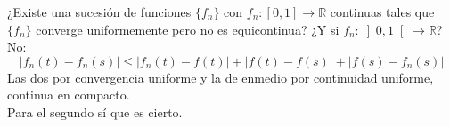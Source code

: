 \begin{ejercicio}
    ¿Existe una sucesión de funciones $\{f_n\}$ con $f_n:[0,1]\to \mathbb{R}$ continuas tales que $\{f_n\}$ converge uniformemente pero no es equicontinua? ¿Y si $f_n:\left]0,1\right[\to \mathbb{R}$?\\

    \noindent
    No:
    \begin{equation*}
        |f_n(t) - f_n(s)| \leq |f_n(t) - f(t)| + |f(t) - f(s)| + |f(s) - f_n(s)|
    \end{equation*}
    Las dos por convergencia uniforme y la de enmedio por continuidad uniforme, continua en compacto.\\

    \noindent
    Para el segundo sí que es cierto.
\end{ejercicio}

